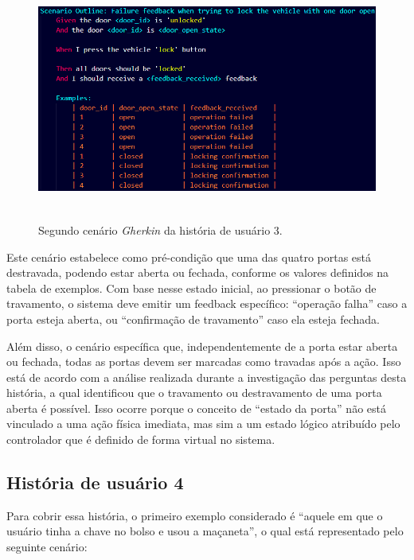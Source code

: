 \begin{figure}[H]
\centering
\includegraphics[height=8cm]{figuras/cenarios/h3c2.png}
\caption{Segundo cenário \textit{Gherkin} da história de usuário 3.}
\label{fig:h3c2}
\end{figure}

Este cenário estabelece como pré-condição que uma das quatro portas está destravada, podendo estar aberta ou fechada, conforme os valores definidos na tabela de exemplos. 
Com base nesse estado inicial, ao pressionar o botão de travamento, o sistema deve emitir um feedback específico: ``operação falha'' caso a porta esteja aberta, ou 
``confirmação de travamento'' caso ela esteja fechada.

Além disso, o cenário específica que, independentemente de a porta estar aberta ou fechada, todas as portas devem ser marcadas como travadas após a ação. Isso está 
de acordo com a análise realizada durante a investigação das perguntas desta história, a qual identificou que o travamento ou destravamento de uma porta aberta é possível. 
Isso ocorre porque o conceito de ``estado da porta'' não está vinculado a uma ação física imediata, mas sim a um estado lógico atribuído pelo controlador que é definido 
de forma virtual no sistema.


\subsection{História de usuário 4}

Para cobrir essa história, o primeiro exemplo considerado é ``aquele em que o usuário tinha a chave no bolso e usou a maçaneta'', o qual está representado pelo seguinte cenário:


